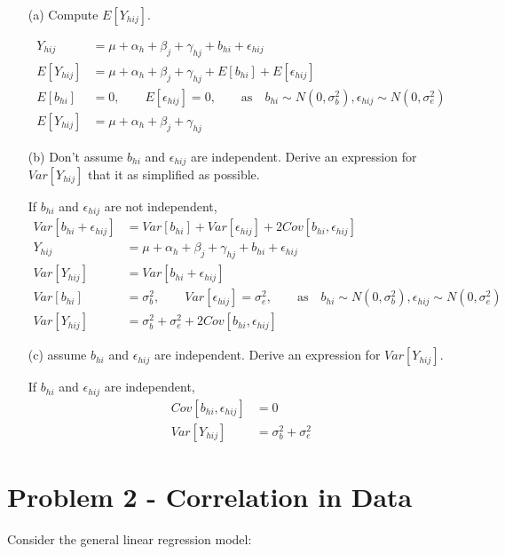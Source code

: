 \documentclass[11pt]{article} %
\begin{document}
\begin{itemize}
\item[(a)] Compute $E[Y_{hij}]$.
	
	\begin{align*}
		Y_{hij} &= \mu + \alpha_h + \beta_j + \gamma_{hj} + b_{hi} + \epsilon_{hij} \\
		E[Y_{hij}] &= \mu + \alpha_h + \beta_j + \gamma_{hj} + E[b_{hi}] + E[\epsilon_{hij}] \\
		 E[b_{hi}] &= 0, \qquad E[\epsilon_{hij}] = 0, \qquad \text{as} \quad b_{hi} \sim N(0, \sigma^2_b), \epsilon_{hij} \sim N(0, \sigma^2_e) \\
		E[Y_{hij}] &= \mu + \alpha_h + \beta_j + \gamma_{hj} 
	\end{align*}

\item[(b)] Don't assume $b_{hi}$ and $\epsilon_{hij}$ are independent. Derive an expression for $Var[Y_{hij}]$ that it as simplified as possible.

If $b_{hi}$ and $\epsilon_{hij}$ are not independent,
\begin{align*}
	Var[b_{hi} + \epsilon_{hij}] &= Var[b_{hi}] + Var[\epsilon_{hij}] +2 Cov[b_{hi}, \epsilon_{hij}] \\
	Y_{hij} &= \mu + \alpha_h + \beta_j + \gamma_{hj} + b_{hi} + \epsilon_{hij} \\
	Var[Y_{hij}] &= Var[b_{hi} + \epsilon_{hij}] \\
	Var[b_{hi}] &= \sigma^2_b, \qquad Var[\epsilon_{hij}] = \sigma^2_e, \qquad \text{as} \quad b_{hi} \sim N(0, \sigma^2_b), \epsilon_{hij} \sim N(0, \sigma^2_e) \\
	Var[Y_{hij}] &= \sigma^2_b + \sigma^2_e + 2 Cov[b_{hi}, \epsilon_{hij}]
\end{align*}

\item[(c)] assume $b_{hi}$ and $\epsilon_{hij}$ are independent. Derive an expression for $Var[Y_{hij}]$. 

If $b_{hi}$ and $\epsilon_{hij}$ are independent,
\begin{align*}
	Cov[b_{hi}, \epsilon_{hij}] &= 0\\
	Var[Y_{hij}] &= \sigma^2_b + \sigma^2_e
\end{align*}

\end{itemize}

\section{Problem 2 - Correlation in Data}
Consider the general linear regression model:
\end{document}
